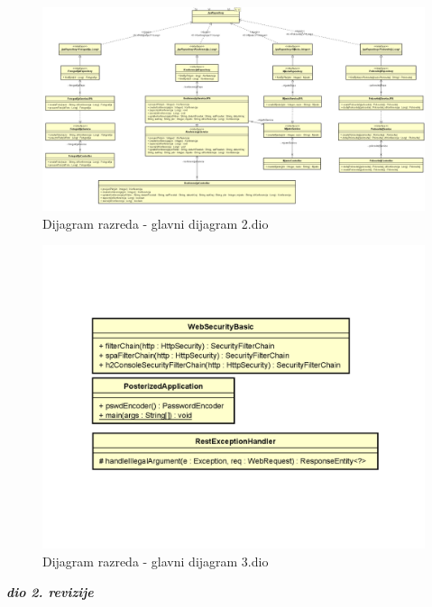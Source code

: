 			\begin{figure}[H]
				\includegraphics[scale=0.4]{dijagrami/glavni_2.png}%
				\centering
				\caption{Dijagram razreda - glavni dijagram 2.dio}
				\label{fig:promjena9.2}
			\end{figure}
			
			\begin{figure}[H]
				\includegraphics[scale=0.5]{dijagrami/glavni_3.png}%
				\centering
				\caption{Dijagram razreda - glavni dijagram 3.dio}
				\label{fig:promjena9.3}
			\end{figure}
			\eject



			\textbf{\textit{dio 2. revizije}}\\			
			
